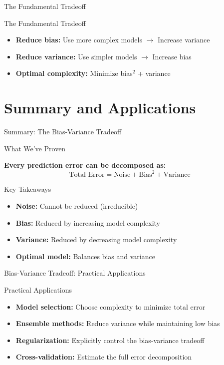 \documentclass[10pt]{beamer}
\begin{document}
\begin{frame}{The Fundamental Tradeoff}
\footnotesize
\begin{keypointsbox}{The Fundamental Tradeoff}
\raggedright
\begin{itemize}
\item \textbf{Reduce bias:} Use more complex models $\rightarrow$ Increase variance
\item \textbf{Reduce variance:} Use simpler models $\rightarrow$ Increase bias
\item \textbf{Optimal complexity:} Minimize bias$^2$ + variance
\end{itemize}
\end{keypointsbox}
\end{frame}

\section{Summary and Applications}

\begin{frame}{Summary: The Bias-Variance Tradeoff}
\small
\begin{definitionbox}{What We've Proven}
\raggedright
\textbf{Every prediction error can be decomposed as:}
$$\text{Total Error} = \text{Noise} + \text{Bias}^2 + \text{Variance}$$
\end{definitionbox}

\begin{keypointsbox}{Key Takeaways}
\raggedright
\begin{itemize}
\item \textbf{Noise:} Cannot be reduced (irreducible)
\item \textbf{Bias:} Reduced by increasing model complexity
\item \textbf{Variance:} Reduced by decreasing model complexity
\item \textbf{Optimal model:} Balances bias and variance
\end{itemize}
\end{keypointsbox}
\end{frame}

\begin{frame}{Bias-Variance Tradeoff: Practical Applications}
\small
\begin{alertbox}{Practical Applications}
\raggedright
\begin{itemize}
\item \textbf{Model selection:} Choose complexity to minimize total error
\item \textbf{Ensemble methods:} Reduce variance while maintaining low bias
\item \textbf{Regularization:} Explicitly control the bias-variance tradeoff
\item \textbf{Cross-validation:} Estimate the full error decomposition
\end{itemize}
\end{alertbox}
\end{frame}
\end{document}
